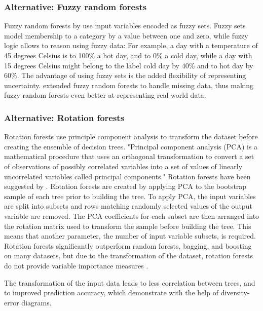 \documentclass[a4paper,man,12pt,apacite,floatsintext,draftfirst]{apa6} %
\begin{document}
\subsubsection{Alternative: Fuzzy random forests}
Fuzzy random forests by  use input variables
encoded as fuzzy sets.
Fuzzy sets \cite{wpFS} model membership to a category by a value between
one and zero, while fuzzy logic \cite{wpFL} allows to reason using fuzzy data:
For example, a day with a temperature of 45 degrees Celsius is to 100\% a
hot day, and to 0\% a cold day, while a day with 15 degrees Celsius might
belong to the label cold day by 40\% and to hot day by 60\%.
The advantage of using fuzzy sets is the added flexibility of representing
uncertainty.
 extended fuzzy random forests to handle
missing data, thus making fuzzy random forests even better at representing
real world data.

\subsubsection{Alternative: Rotation forests}
Rotation forests use principle component analysis to transform
the dataset before creating the ensemble of decision trees.
"Principal component analysis (PCA) is a mathematical procedure that uses
an orthogonal transformation to convert a set of observations of possibly
correlated variables into a set of values of linearly uncorrelated variables
called principal components." \cite{wpPCA}
Rotation forests have been suggested by .
Rotation forests are created by applying PCA
to the bootstrap sample of each tree prior to building the tree.
To apply PCA, the input variables are split into subsets and rows matching
randomly selected values of the output variable are removed.
The PCA coefficients for each subset are then arranged into the rotation matrix
used to transform the sample before building the tree.
This means that another parameter, the number of input variable subsets, is required.
Rotation forests significantly outperform random forests, bagging, and
boosting on many datasets, but due to the transformation of the dataset,
rotation forests do not provide variable importance measures \cite{rodriguez2006rotation}.

The transformation of the input data leads to less correlation between trees,
and to improved prediction accuracy, which 
demonstrate with the help of diversity-error diagrams.
\end{document}
